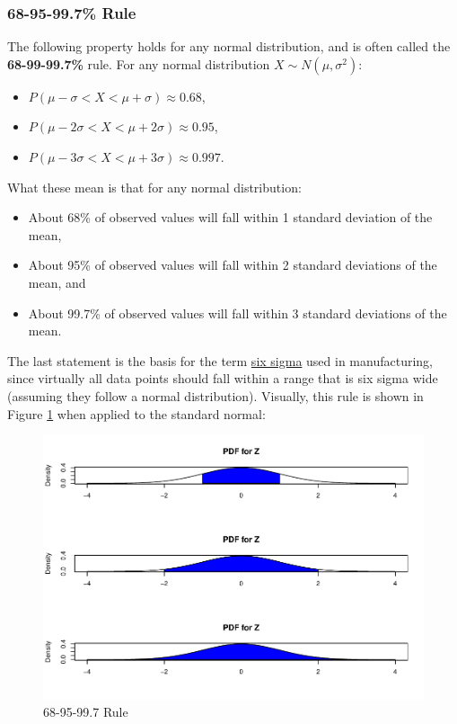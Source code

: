 \documentclass[
]{book}
\providecommand{\tightlist}{%
  \setlength{\itemsep}{0pt}\setlength{\parskip}{0pt}}
\begin{document}
\subsubsection{68-95-99.7\% Rule}\label{rulenorm}

The following property holds for any normal distribution, and is often called the \textbf{68-99-99.7\%} rule. For any normal distribution \(X \sim N(\mu, \sigma^2)\):

\begin{itemize}
\tightlist
\item
  \(P(\mu - \sigma < X < \mu + \sigma) \approx 0.68\),
\item
  \(P(\mu - 2\sigma < X < \mu + 2\sigma) \approx 0.95\),
\item
  \(P(\mu - 3\sigma < X < \mu + 3\sigma) \approx 0.997\).
\end{itemize}

What these mean is that for any normal distribution:

\begin{itemize}
\tightlist
\item
  About 68\% of observed values will fall within 1 standard deviation of the mean,
\item
  About 95\% of observed values will fall within 2 standard deviations of the mean, and
\item
  About 99.7\% of observed values will fall within 3 standard deviations of the mean.
\end{itemize}

The last statement is the basis for the term \href{https://en.wikipedia.org/wiki/Six_Sigma}{six sigma} used in manufacturing, since virtually all data points should fall within a range that is six sigma wide (assuming they follow a normal distribution). Visually, this rule is shown in Figure \ref{fig:4-rule} when applied to the standard normal:

\begin{figure}
\centering
\includegraphics{bookdown-demo_files/figure-latex/4-rule-1.pdf}
\caption{\label{fig:4-rule}68-95-99.7 Rule}
\end{figure}
\end{document}
